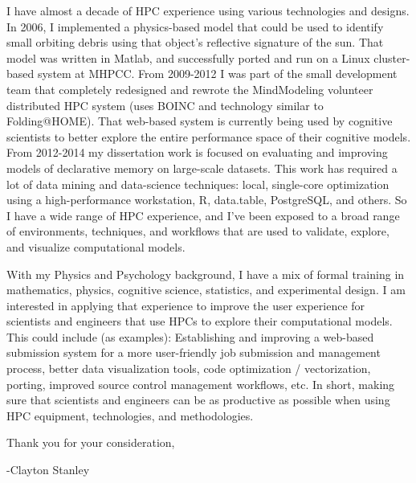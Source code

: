 \documentclass{article}
\begin{document}
I have almost a decade of HPC experience using various technologies and designs.
In 2006, I implemented a physics-based model that could be used to identify small orbiting debris using that object's reflective signature of the sun.
That model was written in Matlab, and successfully ported and run on a Linux cluster-based system at MHPCC.
From 2009-2012 I was part of the small development team that completely redesigned and rewrote the MindModeling volunteer distributed HPC system (uses BOINC and technology similar to Folding@HOME).
That web-based system is currently being used by cognitive scientists to better explore the entire performance space of their cognitive models.
From 2012-2014 my dissertation work is focused on evaluating and improving models of declarative memory on large-scale datasets.
This work has required a lot of data mining and data-science techniques: local, single-core optimization using a high-performance workstation, R, data.table, PostgreSQL, and others.
So I have a wide range of HPC experience, and I've been exposed to a broad range of environments, techniques, and workflows that are used to validate, explore, and visualize computational models.

With my Physics and Psychology background, I have a mix of formal training in mathematics, physics, cognitive science, statistics, and experimental design.
I am interested in applying that experience to improve the user experience for scientists and engineers that use HPCs to explore their computational models.
This could include (as examples): Establishing and improving a web-based submission system for a more user-friendly job submission and management process,
better data visualization tools, code optimization / vectorization, porting, improved source control management workflows, etc.
In short, making sure that scientists and engineers can be as productive as possible when using HPC equipment, technologies, and methodologies.

Thank you for your consideration,

-Clayton Stanley
\end{document}
